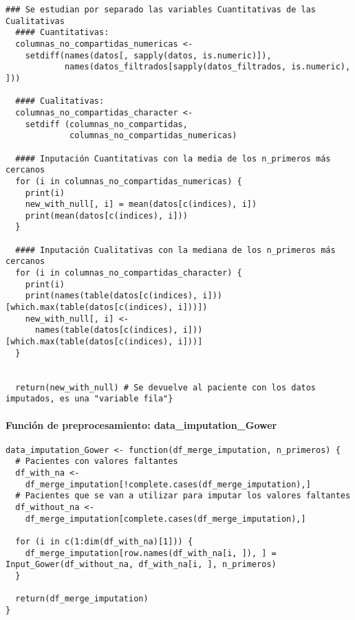 \begin{lstlisting}[style=mystyle,caption={Input\_Gower.R}, label={lst:input-gower-fun}]
  ### Se estudian por separado las variables Cuantitativas de las Cualitativas
  #### Cuantitativas:
  columnas_no_compartidas_numericas <-
    setdiff(names(datos[, sapply(datos, is.numeric)]),
            names(datos_filtrados[sapply(datos_filtrados, is.numeric), ]))
  
  #### Cualitativas:
  columnas_no_compartidas_character <-
    setdiff (columnas_no_compartidas,
             columnas_no_compartidas_numericas)
  
  #### Inputación Cuantitativas con la media de los n_primeros más cercanos
  for (i in columnas_no_compartidas_numericas) {
    print(i)
    new_with_null[, i] = mean(datos[c(indices), i])
    print(mean(datos[c(indices), i]))
  }
  
  #### Inputación Cualitativas con la mediana de los n_primeros más cercanos
  for (i in columnas_no_compartidas_character) {
    print(i)
    print(names(table(datos[c(indices), i]))[which.max(table(datos[c(indices), i]))])
    new_with_null[, i] <-
      names(table(datos[c(indices), i]))[which.max(table(datos[c(indices), i]))]
  }
  
  
  return(new_with_null) # Se devuelve al paciente con los datos imputados, es una "variable fila"}
\end{lstlisting}


\newpage

\paragraph{Función de preprocesamiento: data\_imputation\_Gower}\label{sec:codigo-input-gower-fun-preprocesamiento}

\begin{lstlisting}[style=mystyle,caption={data\_imputation\_Gower.R}, label={lst:input-gower-fun-preprocesamiento}]
  data_imputation_Gower <- function(df_merge_imputation, n_primeros) {
  # Pacientes con valores faltantes
  df_with_na <-
    df_merge_imputation[!complete.cases(df_merge_imputation),]
  # Pacientes que se van a utilizar para imputar los valores faltantes
  df_without_na <-
    df_merge_imputation[complete.cases(df_merge_imputation),]
  
  for (i in c(1:dim(df_with_na)[1])) {
    df_merge_imputation[row.names(df_with_na[i, ]), ] = Input_Gower(df_without_na, df_with_na[i, ], n_primeros)
  }
  
  return(df_merge_imputation)
}
\end{lstlisting}

\vspace{-5pt}

